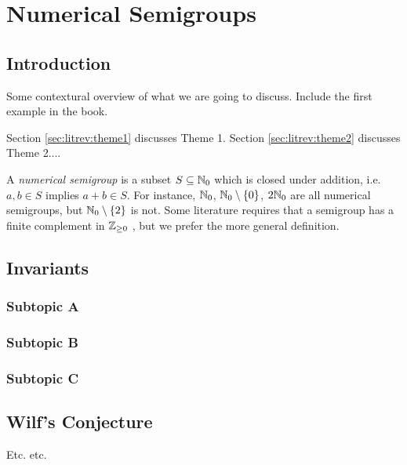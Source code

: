\chapter{Numerical Semigroups}\label{chap:probmet}

\section{Introduction}\label{sec:probmet:intro}

Some contextural overview of what we are going to discuss. Include the first example in the book. 

Section \ref{sec:litrev:theme1} discusses Theme 1. Section \ref{sec:litrev:theme2} discusses Theme 2....

A \textit{numerical semigroup} is a subset $S \subseteq \mathbb{N}_{0}$ which is closed under addition, i.e. $a, b \in S$ implies $a + b \in S$. For instance, $\mathbb{N}_0$, $\mathbb{N}_0 \setminus \{0\}$, $2\mathbb{N}_0$ are all numerical semigroups, but $\mathbb{N}_0 \setminus \{2\}$ is not. Some literature requires that a semigroup has a finite complement in $\mathbb{Z}_{\geq 0}$ \cite{chapman2020beyond}, but we prefer the more general definition. 


\section{Invariants}\label{sec:probmet:theme1}


\subsection{Subtopic A}\label{sec:probmet:theme1:A}

\subsection{Subtopic B}\label{sec:probmet:theme1:B}

\subsection{Subtopic C}\label{sec:probmet:theme1:C}

\section{Wilf's Conjecture}\label{sec:probmet:theme2}

Etc. etc.
